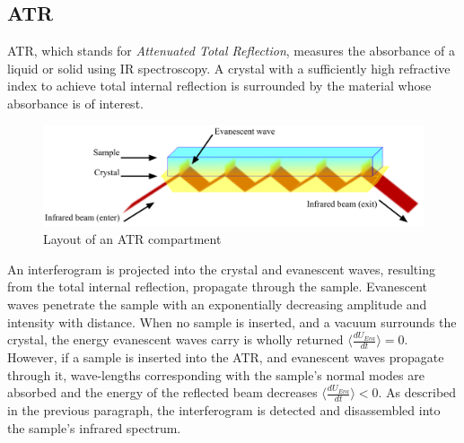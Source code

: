 \documentclass[reprint,amsmath,amssymb,aps, prl,superscriptaddress]{revtex4-2}
\begin{document}
\subsection{ATR}
ATR, which stands for \emph{Attenuated Total Reflection}, measures the absorbance of a liquid or solid using IR spectroscopy. A crystal with a sufficiently high refractive index to achieve total internal reflection is surrounded by the material whose absorbance is of interest. 
\begin{figure}[H]
    \includegraphics[width=\linewidth]{Images/ATR.png}
    \caption{Layout of an ATR compartment \cite{wiki:ATR}}
    \label{fig:ATR}
    \centering
\end{figure}
An interferogram is projected into the crystal and evanescent waves, resulting from the total internal reflection, propagate through the sample. 
Evanescent waves penetrate the sample with an exponentially decreasing amplitude and intensity with distance.
When no sample is inserted, and a vacuum surrounds the crystal, the energy evanescent waves carry is wholly returned $\langle\frac{dU_{Eva}}{dt}\rangle=0$. However, if a sample is inserted into the ATR, and evanescent waves propagate through it, wave-lengths corresponding with the sample's normal modes are absorbed and the energy of the reflected beam decreases $\langle\frac{dU_{Eva}}{dt}\rangle<0$. As described in the previous paragraph, the interferogram is detected and disassembled into the sample's infrared spectrum.
\end{document}
